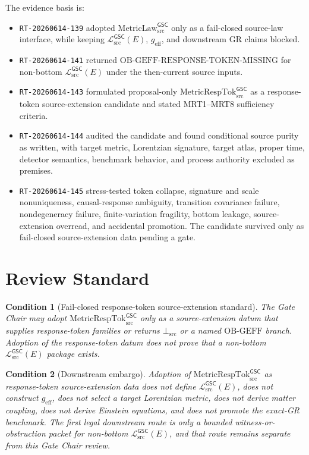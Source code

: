 \documentclass[11pt]{article}
\newcommand{\MetricLaw}{\mathrm{MetricLaw}_{\mathrm{src}}^{\mathsf{GSC}}}
\newcommand{\MetricRespTok}{\mathrm{MetricRespTok}_{\mathrm{src}}^{\mathsf{GSC}}}
\newcommand{\MetricData}{\mathcal{L}_{\mathrm{src}}^{\mathsf{GSC}}}
\newcommand{\BottomSrc}{\bot_{\mathrm{src}}}
\newcommand{\OBGEFF}{\mathrm{OB\mbox{-}GEFF}}
\newcommand{\geff}{g_{\mathrm{eff}}}
\newtheorem{condition}{Condition}
\begin{document}
The evidence basis is:
\begin{itemize}[leftmargin=*]
  \item \texttt{RT-20260614-139} adopted \(\MetricLaw\) only as a fail-closed
  source-law interface, while keeping \(\MetricData(E)\), \(\geff\), and
  downstream GR claims blocked.
  \item \texttt{RT-20260614-141} returned
  \(\mathrm{OB\mbox{-}GEFF\mbox{-}RESPONSE\mbox{-}TOKEN\mbox{-}MISSING}\)
  for non-bottom \(\MetricData(E)\) under the then-current source inputs.
  \item \texttt{RT-20260614-143} formulated proposal-only \(\MetricRespTok\)
  as a response-token source-extension candidate and stated MRT1--MRT8
  sufficiency criteria.
  \item \texttt{RT-20260614-144} audited the candidate and found conditional
  source purity as written, with target metric, Lorentzian signature, target
  atlas, proper time, detector semantics, benchmark behavior, and process
  authority excluded as premises.
  \item \texttt{RT-20260614-145} stress-tested token collapse, signature and
  scale nonuniqueness, causal-response ambiguity, transition covariance
  failure, nondegeneracy failure, finite-variation fragility, bottom leakage,
  source-extension overread, and accidental promotion. The candidate survived
  only as fail-closed source-extension data pending a gate.
\end{itemize}

\section{Review Standard}

\begin{condition}[Fail-closed response-token source-extension standard]
The Gate Chair may adopt \(\MetricRespTok\) only as a source-extension datum
that supplies response-token families or returns \(\BottomSrc\) or a named
\(\OBGEFF\) branch. Adoption of the response-token datum does not prove that a
non-bottom \(\MetricData(E)\) package exists.
\end{condition}

\begin{condition}[Downstream embargo]
Adoption of \(\MetricRespTok\) as response-token source-extension data does
not define \(\MetricData(E)\), does not construct \(\geff\), does not select a
target Lorentzian metric, does not derive matter coupling, does not derive
Einstein equations, and does not promote the exact-GR benchmark. The first
legal downstream route is only a bounded witness-or-obstruction packet for
non-bottom \(\MetricData(E)\), and that route remains separate from this
Gate Chair review.
\end{condition}
\end{document}
